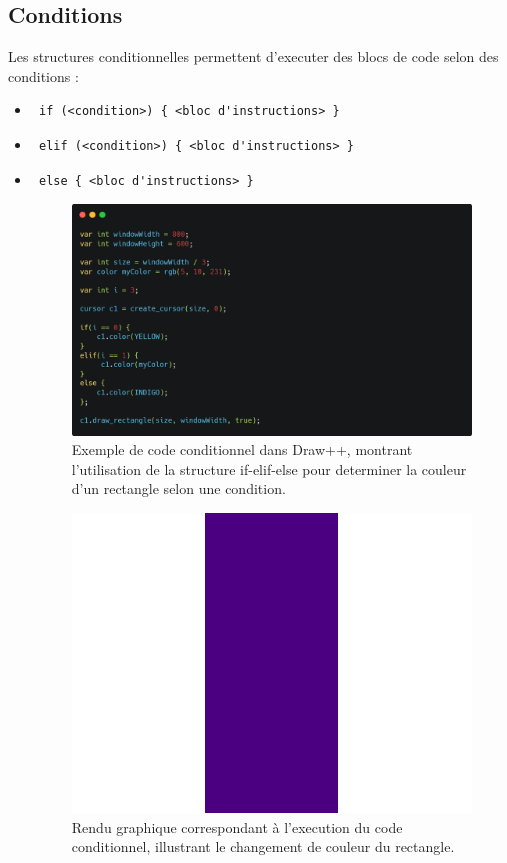 \documentclass[12pt,a4paper]{report}
\begin{document}
\subsection{Conditions}
Les structures conditionnelles permettent d'executer des blocs de code selon des conditions :
\begin{itemize}
    \item \begin{verbatim} if (<condition>) { <bloc d'instructions> }\end{verbatim}
    \item \begin{verbatim} elif (<condition>) { <bloc d'instructions> }\end{verbatim}
    \item \begin{verbatim} else { <bloc d'instructions> }\end{verbatim}
    \begin{figure}[H]
    \centering
    \includegraphics[width=1\linewidth]{assets/code/if_dpp.png}
    \caption{\centering Exemple de code conditionnel dans Draw++, montrant l'utilisation de la structure if-elif-else pour determiner la couleur d'un rectangle selon une condition.}
\end{figure}
\begin{figure}[H]
    \centering
    \includegraphics[width=0.5\linewidth]{assets/render/if.png}
    \caption{\centering Rendu graphique correspondant à l'execution du code conditionnel, illustrant le changement de couleur du rectangle.}
\end{figure}
\end{itemize}
\end{document}
